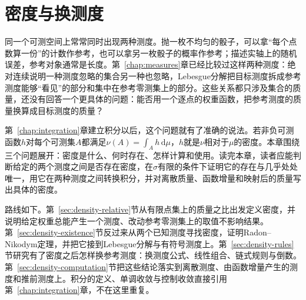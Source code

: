 \chapter{密度与换测度}
\label{chap:densities-change-of-measure}

同一个可测空间上常常同时出现两种测度。抛一枚不均匀的骰子，可以拿“每个点数算一份”的计数作参考，也可以拿另一枚骰子的概率作参考；描述实轴上的随机误差，参考对象通常是长度。第~\ref{chap:measures}章已经比较过这样两种测度：绝对连续说明一种测度忽略的集合另一种也忽略，Lebesgue分解把目标测度拆成参考测度能够“看见”的部分和集中在参考零测集上的部分。这些关系都只涉及集合的质量，还没有回答一个更具体的问题：能否用一个逐点的权重函数，把参考测度的质量换算成目标测度的质量？

第~\ref{chap:integration}章建立积分以后，这个问题就有了准确的说法。若非负可测函数$h$对每个可测集$A$都满足$\nu(A)=\int_Ah\,\mathrm d\mu$，$h$就是$\nu$相对于$\mu$的密度。本章围绕三个问题展开：密度是什么、何时存在、怎样计算和使用。读完本章，读者应能判断给定的两个测度之间是否存在密度，在$\sigma$有限的条件下证明它的存在与几乎处处唯一，用它在两种测度之间转换积分，并对离散质量、函数增量和映射后的质量写出具体的密度。

路线如下。第~\ref{sec:density-relative}节从有限点集上的质量之比出发定义密度，并说明给定权重总能产生一个测度、改动参考零测集上的取值不影响结果。第~\ref{sec:density-existence}节反过来从两个已知测度寻找密度，证明Radon–Nikodym定理，并把它接到Lebesgue分解与有符号测度上。第~\ref{sec:density-rules}节研究有了密度之后怎样换参考测度：换测度公式、线性组合、链式规则与倒数。第~\ref{sec:density-computation}节把这些结论落实到离散测度、由函数增量产生的测度和推前测度上。积分的定义、单调收敛与控制收敛直接引用第~\ref{chap:integration}章，不在这里重复。







